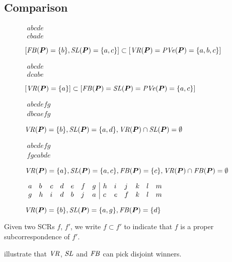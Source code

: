 \documentclass[version=3.21, pagesize, twoside=off, bibliography=totoc, DIV=calc, fontsize=12pt, a4paper]{scrartcl}
\begin{document}
\subsection{Comparison}
\begin{figure}
	\caption{$[\mathit{FB}(\bm{P}) = \{b\}, \mathit{SL}(\bm{P}) = \{a, c\}] \subset [\mathit{VR}(\bm{P}) = \mathit{PVe}(\bm{P}) = \{a, b, c\}]$}
	\label{fig:cbade}
	$\begin{array}{l}
		abcde\\
		cbade
	\end{array}$
\end{figure}
\begin{figure}
	\caption{$[\mathit{VR}(\bm{P}) = \{a\}] \subset [\mathit{FB}(\bm{P}) = \mathit{SL}(\bm{P}) = \mathit{PVe}(\bm{P}) = \{a, c\}]$}
	\label{fig:dcabe}
	$\begin{array}{l}
		abcde\\
		dcabe
	\end{array}$
\end{figure}
\begin{figure}
	\caption{$\mathit{VR}(\bm{P}) = \{b\}, \mathit{SL}(\bm{P}) = \{a, d\}, \mathit{VR}(\bm{P}) \cap \mathit{SL}(\bm{P}) = \emptyset$}
	\label{fig:dbcaefg}
	$\begin{array}{l}
		abcdefg\\
		dbcaefg
	\end{array}$
\end{figure}
\begin{figure}
	\caption{$\mathit{VR}(\bm{P}) = \{a\}, \mathit{SL}(\bm{P}) = \{a, c\}, \mathit{FB}(\bm{P}) = \{c\}, \mathit{VR}(\bm{P}) \cap \mathit{FB}(\bm{P}) = \emptyset$}
	\label{fig:fgcabde}
	$\begin{array}{l}
		abcdefg\\
		fgcabde
	\end{array}$
\end{figure}
\begin{figure}
	\caption{$\mathit{VR}(\bm{P}) = \{b\}, \mathit{SL}(\bm{P}) = \{a, g\}, \mathit{FB}(\bm{P}) = \{d\}$}
	\label{fig:disjoint}
	$\begin{array}{llll lll | llll ll}
		a&b&c&d&e&f&g&h&i&j&k&l&m\\
		g&h&i&d&b&j&a&c&e&f&k&l&m\\
	\end{array}$
\end{figure}

Given two SCRs $f$, $f'$, we write $f \subset f'$ to indicate that $f$ is a proper subcorrespondence of $f'$.

 illustrate that $\mathit{VR}$, $\mathit{SL}$ and $\mathit{FB}$ can pick disjoint winners.
\end{document}
